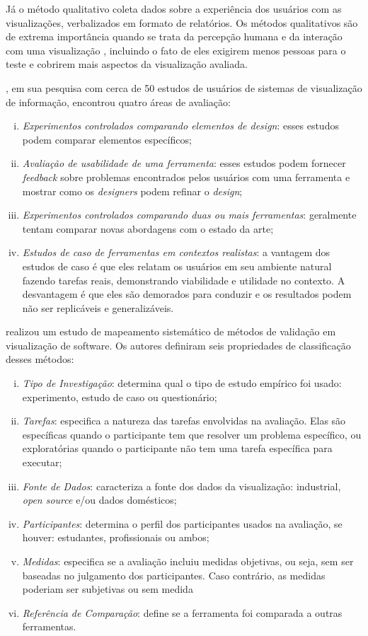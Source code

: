 Já o método qualitativo coleta dados sobre a experiência dos usuários com as visualizações, verbalizados em formato de relatórios. Os métodos qualitativos são de extrema importância quando se trata da percepção humana e da interação com uma visualização \cite{McConathy1993}, incluindo o fato de eles exigirem menos pessoas para o teste e cobrirem mais aspectos da visualização avaliada.

\citeauthor{komlodi2004information}, em sua pesquisa com cerca de 50 estudos de usuários de sistemas de visualização de informação, encontrou quatro áreas de avaliação:
\begin{enumerate}[(i)]
	\item \textit{Experimentos controlados comparando elementos de design}: esses estudos podem comparar elementos específicos;
	\item \textit{Avaliação de usabilidade de uma ferramenta}: esses estudos podem fornecer \textit{feedback} sobre problemas encontrados pelos usuários com uma ferramenta e mostrar como os \textit{designers} podem refinar o \textit{design};
	\item \textit{Experimentos controlados comparando duas ou mais ferramentas}: geralmente tentam comparar novas abordagens com o estado da arte;
	\item \textit{Estudos de caso de ferramentas em contextos realistas}: a vantagem dos estudos de caso é que eles relatam os usuários em seu ambiente natural fazendo tarefas reais, demonstrando viabilidade e utilidade no contexto. A desvantagem é que eles são demorados para conduzir e os resultados podem não ser replicáveis e generalizáveis.
\end{enumerate}

\citeauthor{Seriai2014} realizou um estudo de mapeamento sistemático de métodos de validação em visualização de software. Os autores definiram seis propriedades de classificação desses métodos:
\begin{enumerate}[(i)]
	\item \textit{Tipo de Investigação}: determina qual o tipo de estudo empírico foi usado: experimento, estudo de caso ou questionário;
	\item \textit{Tarefas}: especifica a natureza das tarefas envolvidas na avaliação. Elas são específicas quando o participante tem que resolver um problema específico, ou exploratórias quando o participante não tem uma tarefa específica para executar;
	\item \textit{Fonte de Dados}: caracteriza a fonte dos dados da visualização: industrial, \textit{open source} e/ou dados domésticos;
	\item \textit{Participantes}: determina o perfil dos participantes usados na avaliação, se houver: estudantes, profissionais ou ambos;
	\item \textit{Medidas}: especifica se a avaliação incluiu medidas objetivas, ou seja, sem ser baseadas no julgamento dos participantes. Caso contrário, as medidas poderiam ser subjetivas ou sem medida
	\item \textit{Referência de Comparação}: define se a ferramenta foi comparada a outras ferramentas.
\end{enumerate}

